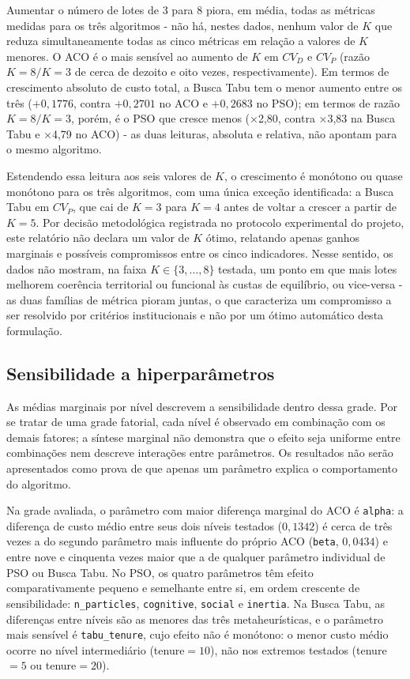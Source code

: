 \documentclass[12pt,a4paper]{article}
\begin{document}
Aumentar o número de lotes de 3 para 8 piora, em média, todas as métricas
medidas para os três algoritmos - não há, nestes dados, nenhum valor de $K$
que reduza simultaneamente todas as cinco métricas em relação a valores
de $K$ menores. O ACO é o mais sensível ao aumento de $K$ em $CV_D$ e
$CV_P$ (razão $K{=}8/K{=}3$ de cerca de dezoito e oito vezes,
respectivamente). Em termos de crescimento absoluto de custo total, a Busca
Tabu tem o menor aumento entre os três ($+0{,}1776$, contra $+0{,}2701$ no
ACO e $+0{,}2683$ no PSO); em termos de razão $K{=}8/K{=}3$, porém, é o PSO
que cresce menos (×2,80, contra ×3,83 na Busca Tabu e ×4,79 no ACO) - as
duas leituras, absoluta e relativa, não apontam para o mesmo algoritmo.

Estendendo essa leitura aos seis valores de $K$, o crescimento é monótono ou
quase monótono para os três algoritmos, com uma única exceção identificada:
a Busca Tabu em $CV_P$, que cai de $K=3$ para $K=4$ antes de voltar a
crescer a partir de $K=5$. Por decisão metodológica registrada no protocolo
experimental do projeto, este relatório não declara um valor de $K$ ótimo,
relatando apenas ganhos marginais e possíveis compromissos entre os cinco
indicadores. Nesse sentido, os dados não
mostram, na faixa $K\in\{3,\ldots,8\}$ testada, um ponto em que mais lotes
melhorem coerência territorial ou funcional às custas de equilíbrio, ou
vice-versa - as duas famílias de métrica pioram juntas, o que caracteriza
um compromisso a ser resolvido por critérios institucionais e não por um
ótimo automático desta formulação.

\subsection{Sensibilidade a hiperparâmetros}
\label{subsec:sensibilidade}

As médias marginais por nível descrevem a sensibilidade dentro dessa grade. Por se
tratar de uma grade fatorial, cada nível é observado em combinação com os demais
fatores; a síntese marginal não demonstra que o efeito seja uniforme entre combinações
nem descreve interações entre parâmetros. Os resultados não serão apresentados como
prova de que apenas um parâmetro explica o comportamento do algoritmo.

Na grade avaliada, o parâmetro com maior diferença marginal do ACO é \texttt{alpha}: a
diferença de custo médio entre seus dois níveis testados
($0{,}1342$) é cerca de três vezes a do segundo parâmetro mais influente do
próprio ACO (\texttt{beta}, $0{,}0434$) e entre nove e cinquenta vezes maior
que a de qualquer parâmetro individual de PSO ou Busca Tabu. No PSO, os
quatro parâmetros têm efeito comparativamente pequeno e semelhante entre si,
em ordem crescente de sensibilidade: \texttt{n\_particles}, \texttt{cognitive},
\texttt{social} e \texttt{inertia}. Na Busca Tabu, as diferenças entre
níveis são as menores das três metaheurísticas, e o parâmetro mais sensível
é \texttt{tabu\_tenure}, cujo efeito não é monótono: o menor custo médio
ocorre no nível intermediário (tenure$=10$), não nos extremos testados
(tenure$=5$ ou tenure$=20$).
\end{document}
